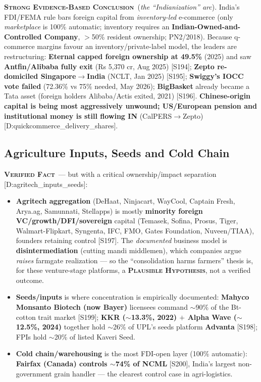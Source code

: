 \documentclass[11pt,a4paper]{article}
\newcommand{\VF}{\textcolor{vfcol}{\textsc{\textbf{Verified Fact}}}}
\newcommand{\SE}{\textcolor{secol}{\textsc{\textbf{Strong Evidence-Based Conclusion}}}}
\newcommand{\PH}{\textcolor{phcol}{\textsc{\textbf{Plausible Hypothesis}}}}
\newcommand{\cs}[1]{\textnormal{[#1]}}
\begin{document}
\SE\ (\emph{the ``Indianization'' arc}). India's FDI/FEMA rule bars foreign capital from \emph{inventory-led} e-commerce (only \emph{marketplace} is 100\% automatic; inventory requires an \textbf{Indian-Owned-and-Controlled Company}, $>$50\% resident ownership; PN2/2018). Because q-commerce margins favour an inventory/private-label model, the leaders are restructuring: \textbf{Eternal capped foreign ownership at 49.5\%} (2025) and saw \textbf{Antfin/Alibaba fully exit} (Rs 5{,}370 cr, Aug 2025) \cs{S194}; \textbf{Zepto re-domiciled Singapore$\rightarrow$India} (NCLT, Jan 2025) \cs{S195}; \textbf{Swiggy's IOCC vote failed} (72.36\% vs 75\% needed, May 2026); \textbf{BigBasket} already became a Tata asset (foreign holders Alibaba/Actis exited, 2021) \cs{S196}. \textbf{Chinese-origin capital is being most aggressively unwound; US/European pension and institutional money is still flowing IN} (CalPERS$\rightarrow$Zepto) \cs{D:quickcommerce\_delivery\_shares}.

\subsection{Agriculture Inputs, Seeds and Cold Chain}

\VF\ --- but with a critical ownership/impact separation \cs{D:agritech\_inputs\_seeds}:
\begin{itemize}[leftmargin=1.4em,itemsep=2pt]
\item \textbf{Agritech aggregation} (DeHaat, Ninjacart, WayCool, Captain Fresh, Arya.ag, Samunnati, Stellapps) is mostly \textbf{minority foreign VC/growth/DFI/sovereign} capital (Temasek, Sofina, Prosus, Tiger, Walmart-Flipkart, Syngenta, IFC, FMO, Gates Foundation, Nuveen/TIAA), founders retaining control \cs{S197}. The \emph{documented} business model is \textbf{disintermediation} (cutting mandi middlemen), which companies argue \emph{raises} farmgate realization --- so the ``consolidation harms farmers'' thesis is, for these venture-stage platforms, a \PH, not a verified outcome.
\item \textbf{Seeds/inputs} is where concentration is empirically documented: \textbf{Mahyco Monsanto Biotech (now Bayer)} licensees command $\sim$90\% of the Bt-cotton trait market \cs{S199}; \textbf{KKR ($\sim$13.3\%, 2022) $+$ Alpha Wave ($\sim$12.5\%, 2024)} together hold $\sim$26\% of UPL's seeds platform \textbf{Advanta} \cs{S198}; FPIs hold $\sim$20\% of listed Kaveri Seed.
\item \textbf{Cold chain/warehousing} is the most FDI-open layer (100\% automatic): \textbf{Fairfax (Canada) controls $\sim$74\% of NCML} \cs{S200}, India's largest non-government grain handler --- the clearest control case in agri-logistics.
\end{itemize}
\end{document}
